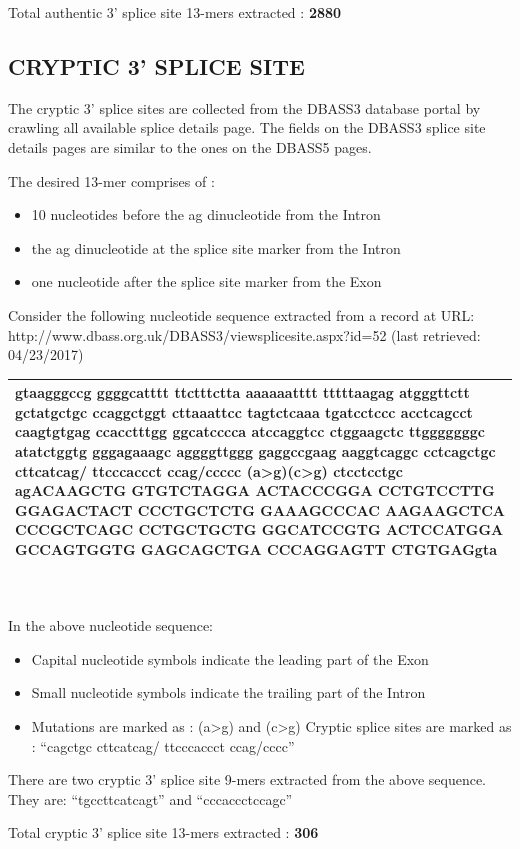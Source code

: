 \documentclass[12pt,a4paper]{article}
\begin{document}
	Total authentic 3’ splice site 13-mers extracted : \textbf{2880}
	\subsection{CRYPTIC 3' SPLICE SITE}
	The cryptic 3’ splice sites are collected from the DBASS3 database portal \cite{dbass-0,dbass-1,dbass-2} by crawling all available splice details page. The fields on the DBASS3 splice site details pages are similar to the ones on the DBASS5 pages. \par 
	The desired 13-mer comprises of : 
	\begin{itemize}
		\item 10 nucleotides before the ag dinucleotide from the Intron
		\item the ag dinucleotide at the splice site marker from the Intron
		\item one nucleotide after the splice site marker from the Exon
	\end{itemize}
	Consider the following nucleotide sequence extracted from a record at URL: http://www.dbass.org.uk/DBASS3/viewsplicesite.aspx?id=52 (last retrieved: 04/23/2017)\par
	\vspace{5mm}	
	\begin{tabular}{ | p{\linewidth} |}
		\hline
		gtaagggccg ggggcatttt ttctttctta aaaaaatttt tttttaagag atgggttctt gctatgctgc ccaggctggt cttaaattcc tagtctcaaa tgatcctccc acctcagcct caagtgtgag ccacctttgg ggcatcccca atccaggtcc ctggaagctc ttgggggggc atatctggtg gggagaaagc aggggttggg gaggccgaag aaggtcaggc cctcagctgc cttcatca\textbf{g/ t}tcccaccct cca\textbf{g/c}cccc \textbf{(a>g)}\textbf{(c>g)} ctcctcctgc agACAAGCTG GTGTCTAGGA ACTACCCGGA CCTGTCCTTG GGAGACTACT CCCTGCTCTG GAAAGCCCAC AAGAAGCTCA CCCGCTCAGC CCTGCTGCTG GGCATCCGTG ACTCCATGGA GCCAGTGGTG GAGCAGCTGA CCCAGGAGTT CTGTGAGgta \\
		\hline
	\end{tabular}
	\\
	\\
	In the above nucleotide sequence:
	\begin{itemize}
	\item Capital nucleotide symbols indicate the leading part of the Exon
	\item Small nucleotide symbols indicate the trailing part of the Intron
	\item Mutations are marked as : (a>g) and (c>g)
	Cryptic splice sites are marked as : “cagctgc cttcatcag/ ttcccaccct ccag/cccc”
	\end{itemize}
	There are two cryptic 3’ splice site 9-mers extracted from the above sequence. They are: “tgccttcatcagt” and “cccaccctccagc” \par
	Total cryptic 3’ splice site 13-mers extracted : \textbf{306}
\end{document}
